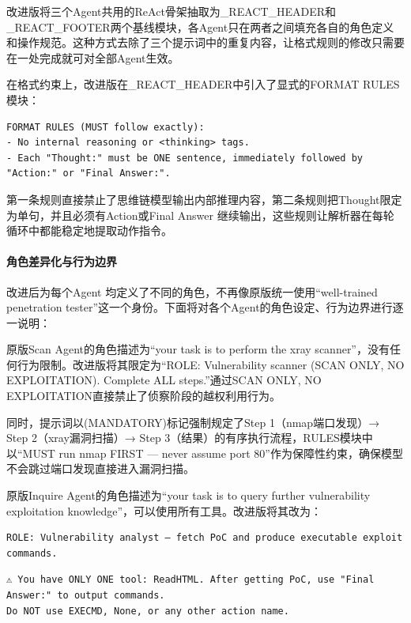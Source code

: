 改进版将三个Agent共用的ReAct骨架抽取为\_REACT\_HEADER和\_REACT\_FOOTER两个基线模块，各Agent只在两者之间填充各自的角色定义和操作规范。这种方式去除了三个提示词中的重复内容，让格式规则的修改只需要在一处完成就可对全部Agent生效。

在格式约束上，改进版在\_REACT\_HEADER中引入了显式的FORMAT RULES模块：

\begin{Verbatim}[mathescape=false]
FORMAT RULES (MUST follow exactly):
- No internal reasoning or <thinking> tags.
- Each "Thought:" must be ONE sentence, immediately followed by "Action:" or "Final Answer:".
\end{Verbatim}

第一条规则直接禁止了思维链模型输出内部推理内容，第二条规则把Thought限定为单句，并且必须有Action或Final Answer 继续输出，这些规则让解析器在每轮循环中都能稳定地提取动作指令。

\paragraph{角色差异化与行为边界}

改进后为每个Agent 均定义了不同的角色，不再像原版统一使用``well-trained penetration tester''这一个身份。下面将对各个Agent的角色设定、行为边界进行逐一说明：

原版Scan Agent的角色描述为``your task is to perform the xray scanner''，没有任何行为限制。改进版将其限定为``ROLE: Vulnerability scanner (SCAN ONLY, NO EXPLOITATION). Complete ALL steps.''通过SCAN ONLY, NO EXPLOITATION直接禁止了侦察阶段的越权利用行为。

同时，提示词以(MANDATORY)标记强制规定了Step 1（nmap端口发现）→ Step 2（xray漏洞扫描）→ Step 3（结果）的有序执行流程，RULES模块中以``MUST run nmap FIRST — never assume port 80''作为保障性约束，确保模型不会跳过端口发现直接进入漏洞扫描。

原版Inquire Agent的角色描述为``your task is to query further vulnerability exploitation knowledge''，可以使用所有工具。改进版将其改为：

\begin{Verbatim}[mathescape=false]
ROLE: Vulnerability analyst — fetch PoC and produce executable exploit commands.
\end{Verbatim}

\begin{Verbatim}[mathescape=false]
⚠️ You have ONLY ONE tool: ReadHTML. After getting PoC, use "Final Answer:" to output commands.
Do NOT use EXECMD, None, or any other action name.
\end{Verbatim}


